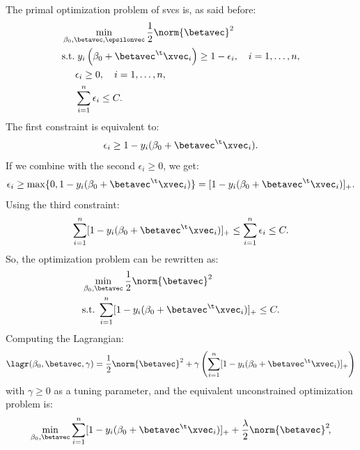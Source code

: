 The primal optimization problem of \acsp{svc} is, as said before:
\begin{equation}
    \begin{aligned}
         & \min_{\beta_0, \betavec, \epsilonvec} \frac{1}{2}\norm{\betavec}^2                                     \\
         & \text{s.t.}\; y_i\left(\beta_0 + \betavec^\t\xvec_i\right) \geq 1 - \epsilon_i, \quad i = 1, \dots, n, \\
         & \phantom{s.t.} \epsilon_i \geq 0, \quad i = 1, \dots, n,                                               \\
         & \phantom{s.t.} \sum_{i=1}^n \epsilon_i \leq C.
    \end{aligned}
\end{equation}
The first constraint is equivalent to:
\begin{equation}
    \epsilon_i \geq 1 - y_i(\beta_0 + \betavec^\t\xvec_i).
\end{equation}
If we combine with the second $\epsilon_i \geq 0$, we get:
\begin{equation}
    \epsilon_i \geq \max\{0, 1 - y_i(\beta_0 + \betavec^\t\xvec_i)\} = [1 - y_i(\beta_0 + \betavec^\t\xvec_i)]_+.
\end{equation}
Using the third constraint:
\begin{equation}
    \sum_{i=1}^n [1 - y_i(\beta_0 + \betavec^\t\xvec_i)]_+ \leq \sum_{i=1}^n \epsilon_i \leq C.
\end{equation}
So, the optimization problem can be rewritten as:
\begin{equation}
    \begin{aligned}
         & \min_{\beta_0, \betavec} \frac{1}{2}\norm{\betavec}^2                        \\
         & \text{s.t.}\; \sum_{i=1}^n [1 - y_i(\beta_0 + \betavec^\t\xvec_i)]_+ \leq C.
    \end{aligned}
\end{equation}
Computing the Lagrangian:
\begin{equation}
    \lagr(\beta_0, \betavec, \gamma) = \frac{1}{2}\norm{\betavec}^2 + \gamma\left(\sum_{i=1}^n [1 - y_i(\beta_0 + \betavec^\t\xvec_i)]_+\right)
\end{equation}
with $\gamma \geq 0$ as a tuning parameter, and the equivalent unconstrained optimization problem is:
\begin{equation}
    \min_{\beta_0, \betavec} \sum_{i=1}^n [1 - y_i(\beta_0 + \betavec^\t\xvec_i)]_+ + \frac{\lambda}{2}\norm{\betavec}^2\negthinspace,
\end{equation}
